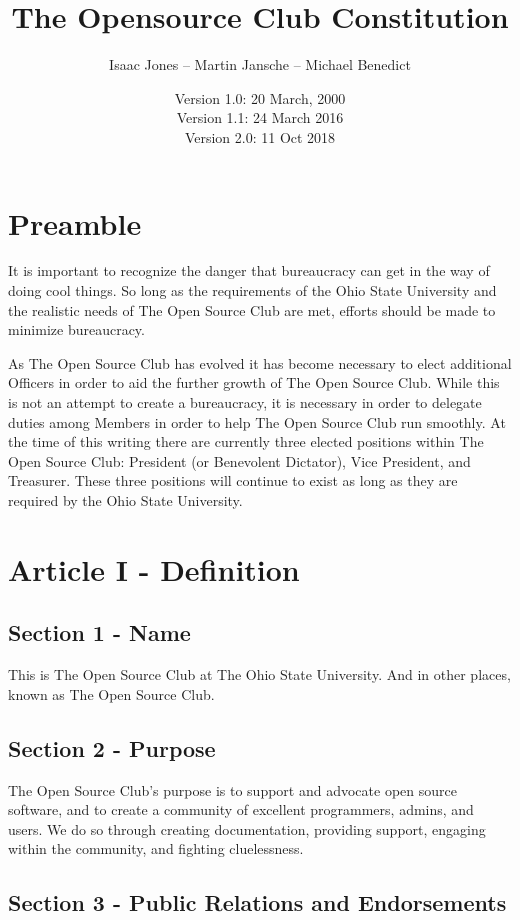 \documentclass{article}
\title{The Opensource Club Constitution}
\author{Isaac Jones -- Martin Jansche -- Michael Benedict}
\date{Version 1.0: 20 March, 2000\\Version 1.1: 24 March 2016\\Version 2.0: 11 Oct 2018}
\begin{document}
	\maketitle

	\section{Preamble}

	It is important to recognize the danger that bureaucracy can get in the way of doing cool things.  So long as the requirements of the Ohio State University and the realistic needs of The Open Source Club are met, efforts should be made to minimize bureaucracy.

	As The Open Source Club has evolved it has become necessary to elect additional Officers in order to aid the further growth of The Open Source Club. While this is not an attempt to create a bureaucracy, it is necessary in order to delegate duties among Members in order to help The Open Source Club run smoothly. At the time of this writing there are currently three elected positions within The Open Source Club: President (or Benevolent Dictator), Vice President, and Treasurer. These three positions will continue to exist as long as they are required by the Ohio State University.

	\section{Article I - Definition}

	\subsection{Section 1 - Name}

	This is The Open Source Club at The Ohio State University. And in other places, known as The Open Source Club.

	\subsection{Section 2 - Purpose}

	The Open Source Club's purpose is to support and advocate open source software, and to create a community of excellent programmers, admins, and users. We do so through creating documentation, providing support, engaging within the community, and fighting cluelessness.

  \subsection{Section 3 - Public Relations and Endorsements}
\end{document}

